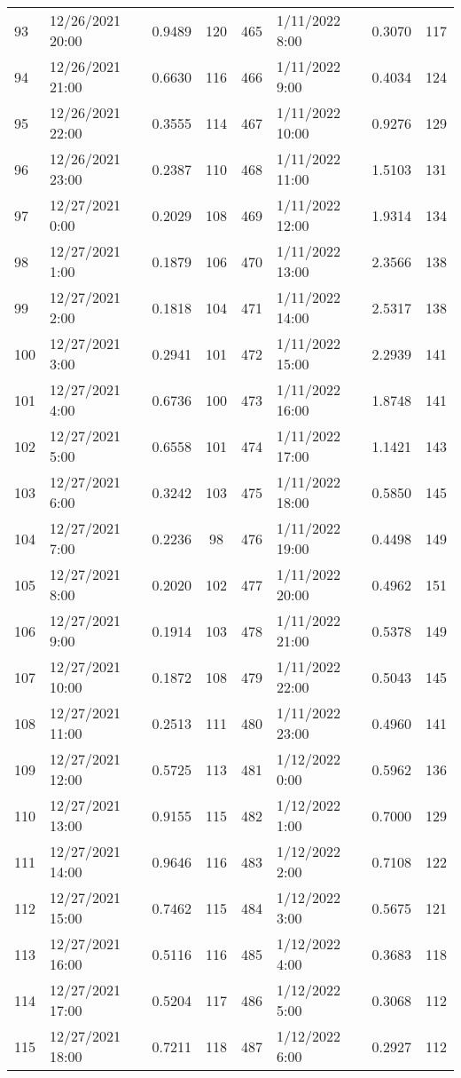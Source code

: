 \begin{center}
\begin{longtable}{llccllcc}
    93&12/26/2021  20:00&0.9489&120&465&1/11/2022 8:00	    &0.3070&117 \\
    94&12/26/2021  21:00&0.6630&116&466&1/11/2022 9:00	    &0.4034&124 \\
    95&12/26/2021  22:00&0.3555&114&467&1/11/2022 10:00	    &0.9276&129 \\
    96&12/26/2021  23:00&0.2387&110&468&1/11/2022 11:00	    &1.5103&131 \\
    97&12/27/2021  0:00	   &0.2029&108&469&1/11/2022 12:00	    &1.9314&134 \\
    98&12/27/2021  1:00	   &0.1879&106&470&1/11/2022 13:00	    &2.3566&138 \\
    99&12/27/2021  2:00	   &0.1818&104&471&1/11/2022 14:00	    &2.5317&138 \\
    100&12/27/2021 3:00	   &0.2941&101&472&1/11/2022 15:00	    &2.2939&141 \\
    101&12/27/2021 4:00	   &0.6736&100&473&1/11/2022 16:00	    &1.8748&141 \\
    102&12/27/2021 5:00	   &0.6558&101&474&1/11/2022 17:00	    &1.1421&143 \\
    103&12/27/2021 6:00	   &0.3242&103&475&1/11/2022 18:00	    &0.5850&145 \\
    104&12/27/2021 7:00	   &0.2236&98 &476&1/11/2022 19:00	    &0.4498&149 \\
    105&12/27/2021 8:00	   &0.2020&102&477&1/11/2022 20:00	    &0.4962&151 \\
    106&12/27/2021 9:00	   &0.1914&103&478&1/11/2022 21:00	    &0.5378&149 \\
    107&12/27/2021 10:00&0.1872&108&479&1/11/2022 22:00	    &0.5043&145 \\
    108&12/27/2021 11:00&0.2513&111&480&1/11/2022 23:00	    &0.4960&141 \\
    109&12/27/2021 12:00&0.5725&113&481&1/12/2022 0:00	    &0.5962&136 \\
    110&12/27/2021 13:00&0.9155&115&482&1/12/2022 1:00	    &0.7000&129 \\
    111&12/27/2021 14:00&0.9646&116&483&1/12/2022 2:00	    &0.7108&122 \\
    112&12/27/2021 15:00&0.7462&115&484&1/12/2022 3:00	    &0.5675&121 \\
    113&12/27/2021 16:00&0.5116&116&485&1/12/2022 4:00	    &0.3683&118 \\
    114&12/27/2021 17:00&0.5204&117&486&1/12/2022 5:00	    &0.3068&112 \\
    115&12/27/2021 18:00&0.7211&118&487&1/12/2022 6:00	    &0.2927&112 \\

\end{longtable}
\end{center}
